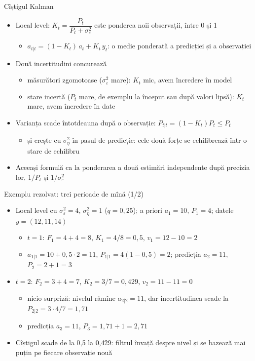 \begin{frame}{Cîștigul Kalman}
\itemsize{\small}
\begin{itemize}
    \item Local level: $K_t = \dfrac{P_t}{P_t + \sigma^2_\varepsilon}$ este ponderea noii observații, între 0 și 1
    \begin{itemize}
        \item $a_{t|t} = (1 - K_t)\,a_t + K_t\,y_t$: o medie ponderată a predicției și a observației
    \end{itemize}
    \item Două incertitudini concurează
    \begin{itemize}
        \item măsurători zgomotoase ($\sigma^2_\varepsilon$ mare): $K_t$ mic, avem încredere în model
        \item stare incertă ($P_t$ mare, de exemplu la început sau după valori lipsă): $K_t$ mare, avem încredere în date
    \end{itemize}
    \item Varianța scade întotdeauna după o observație: $P_{t|t} = (1 - K_t)P_t \le P_t$
    \begin{itemize}
        \item și crește cu $\sigma^2_\eta$ în pasul de predicție: cele două forțe se echilibrează într-o stare de echilibru
    \end{itemize}
    \item Aceeași formulă ca la ponderarea a două estimări independente după precizia lor, $1/P_t$ și $1/\sigma^2_\varepsilon$
\end{itemize}
\end{frame}

\begin{frame}{Exemplu rezolvat: trei perioade de mînă (1/2)}
\itemsize{\small}
\begin{itemize}
    \item Local level cu $\sigma^2_\varepsilon = 4$, $\sigma^2_\eta = 1$ ($q = 0{,}25$); a priori $a_1 = 10$, $P_1 = 4$; datele $y = (12, 11, 14)$
    \begin{itemize}
        \item $t = 1$: $F_1 = 4 + 4 = 8$, $K_1 = 4/8 = 0{,}5$, $v_1 = 12 - 10 = 2$
        \item $a_{1|1} = 10 + 0{,}5 \cdot 2 = 11$, $P_{1|1} = 4(1 - 0{,}5) = 2$; predicția $a_2 = 11$, $P_2 = 2 + 1 = 3$
    \end{itemize}
    \item $t = 2$: $F_2 = 3 + 4 = 7$, $K_2 = 3/7 = 0{,}429$, $v_2 = 11 - 11 = 0$
    \begin{itemize}
        \item nicio surpriză: nivelul rămîne $a_{2|2} = 11$, dar incertitudinea scade la $P_{2|2} = 3 \cdot 4/7 = 1{,}71$
        \item predicția $a_3 = 11$, $P_3 = 1{,}71 + 1 = 2{,}71$
    \end{itemize}
    \item Cîștigul scade de la 0,5 la 0{,}429: filtrul învață despre nivel și se bazează mai puțin pe fiecare observație nouă
\end{itemize}
\end{frame}

